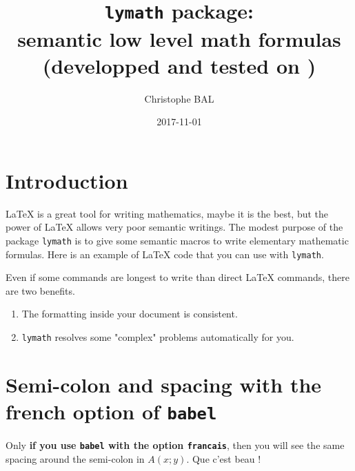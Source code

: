 \documentclass[12pt,a4paper]{article}
\theoremstyle{definition}
\begin{document}
\title{\texttt{lymath} package:\\semantic low level math formulas\\{\footnotesize (developped and tested on \macosxname{})}}
\author{Christophe BAL}
\date{2017-11-01}

\maketitle




\section{Introduction}

\LaTeX{} is a great tool for writing mathematics, maybe it is the best, but the power of \LaTeX{} allows very poor semantic writings.
The modest purpose of the package \verb+lymath+ is to give some semantic macros to write elementary mathematic formulas.
Here is an example of \LaTeX{} code that you can use with \verb+lymath+.

\begin{tcblisting}{listing only}

Knowing that $\frac{df}{dx}(x) = 4 cos(x^2)$ on $[a ; b]$, we have: 
$\int_a^b cos(x^2) dx = \left[ \frac{1){4} f(x) \right]_a^b$.


Knowing that $\derfrac{f}{x}(x) = 4 cos(x^2)$ on $\intervalC{a}{b}$, we have: 
$\int_a^b cos(x^2) \dd{x} = \hook{\frac{1){4} f(x)}{a}{b}$.
\end{tcblisting}

Even if some commands are longest to write than direct \LaTeX{} commands, there are two benefits.
\begin{enumerate}
	\item The formatting inside your document is consistent.

	\item \verb+lymath+ resolves some "complex" problems automatically for you.
\end{enumerate}




\section{Semi-colon and spacing with the french option of \texttt{babel}}

\begin{tcblisting}{}
Only \textbf{if you use \texttt{babel} with the option \texttt{francais}}, then
you will see the same spacing around the semi-colon in $A(x;y)$. Que c'est beau !
\end{tcblisting}
\end{document}
